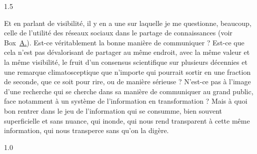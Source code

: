 \begin{spacing}{1.5}
~
\end{spacing}

 
Et en parlant de visibilité, il y en a une sur laquelle je me questionne, beaucoup, celle de l'utilité des réseaux sociaux dans le partage de connaissances (voir Box~\hyperref[box:Conferences]{\uppercase\expandafter{A\relax}.\theConferences{}}). Est-ce véritablement la bonne manière de communiquer ? Est-ce que cela n'est pas dévalorisant de partager au même endroit, avec la même valeur et la même visibilité, le fruit d'un consensus scientifique sur plusieurs décennies et une remarque climatosceptique que n'importe qui pourrait sortir en une fraction de seconde, que ce soit pour rire, ou de manière sérieuse ? N'est-ce pas à l'image d'une recherche qui se cherche dans sa manière de communiquer au grand public, face notamment à un système de l'information en transformation ? Mais à quoi bon rentrer dans le jeu de l'information qui se consumme, bien souvent superficielle et sans nuance, qui inonde, qui nous rend transparent à cette même information, qui nous transperce sans qu'on la digère.

\begin{spacing}{1.0}
~
\end{spacing}

